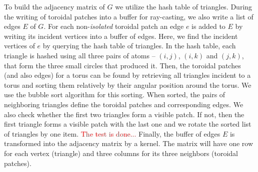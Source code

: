 To build the adjacency matrix of $G$ we utilize the hash table of triangles.
During the writing of toroidal patches into a buffer for ray-casting, we also write a list of edges $E$ of $G$.
For each non-\textit{isolated} toroidal patch an edge $e$ is added to $E$ by writing its incident vertices into a buffer of edges.
Here, we find the incident vertices of $e$ by querying the hash table of triangles.
In the hash table, each triangle is hashed using all three pairs of atoms -- $(i, j)$, $(i, k)$ and $(j, k)$, that form the three small circles that produced it.
Then, the toroidal patches (and also edges) for a torus can be found by retrieving all triangles incident to a torus and sorting them relatively by their angular position around the torus.
We use the bubble sort algorithm for this sorting.
When sorted, the pairs of neighboring triangles define the toroidal patches and corresponding edges.
We also check whether the first two triangles form a visible patch.
If not, then the first triangle forms a visible patch with the last one and we rotate the sorted list of triangles by one item.
\textcolor{red}{The test is done...}
Finally, the buffer of edges $E$ is transformed into the adjacency matrix by a kernel.
The matrix will have one row for each vertex (triangle) and three columns for its three neighbors (toroidal patches).%

